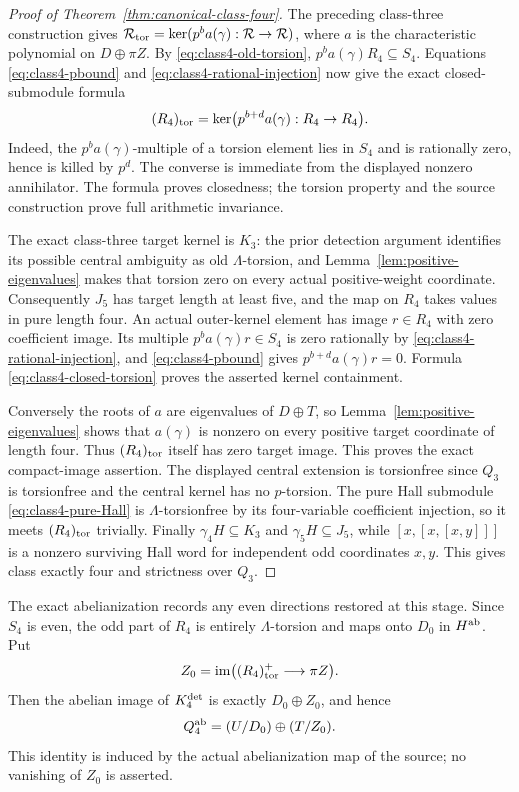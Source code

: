 \documentclass[11pt]{article}
\theoremstyle{definition}\newtheorem{definition}[theorem]{Definition}
\begin{document}
\begin{proof}[Proof of Theorem~\ref{thm:canonical-class-four}]
The preceding class-three construction gives
$\mathcal R_{\rm tor}=\ker(p^ba(\gamma):\mathcal R\to\mathcal R)$, where $a$
is the characteristic polynomial on $D\oplus\pi Z$.
By \eqref{eq:class4-old-torsion},
$p^ba(\gamma)R_4\subseteq S_4$. Equations
\eqref{eq:class4-pbound} and
\eqref{eq:class4-rational-injection} now give the exact
closed-submodule formula
\begin{equation}\label{eq:class4-closed-torsion}
 (R_4)_{\rm tor}
       =\ker\bigl(p^{b+d}a(\gamma):R_4\to R_4\bigr).
\end{equation}
Indeed, the $p^ba(\gamma)$-multiple of a torsion element
lies in $S_4$ and is rationally zero, hence is killed
by $p^d$. The converse is immediate from the displayed
nonzero annihilator. The formula proves closedness;
the torsion property and the source construction prove
full arithmetic invariance.

The exact class-three target kernel is $K_3$:
the prior detection argument identifies its possible
central ambiguity as old $\Lambda$-torsion, and
Lemma~\ref{lem:positive-eigenvalues} makes that torsion
zero on every actual positive-weight coordinate.
Consequently $J_5$ has target length at least five,
and the map on $R_4$ takes values in pure length four.
An actual outer-kernel element has image $r\in R_4$
with zero coefficient image. Its multiple
$p^ba(\gamma)r\in S_4$ is zero rationally by
\eqref{eq:class4-rational-injection}, and
\eqref{eq:class4-pbound} gives
$p^{b+d}a(\gamma)r=0$. Formula
\eqref{eq:class4-closed-torsion} proves the asserted
kernel containment.

Conversely the roots of $a$ are eigenvalues of
$D\oplus T$, so Lemma~\ref{lem:positive-eigenvalues}
shows that $a(\gamma)$ is nonzero on every positive
target coordinate of length four. Thus
$(R_4)_{\rm tor}$ itself has zero target image.
This proves the exact compact-image assertion.
The displayed central extension is torsionfree since
$Q_3$ is torsionfree and the central kernel has no
$p$-torsion. The pure Hall submodule
\eqref{eq:class4-pure-Hall} is $\Lambda$-torsionfree by
its four-variable coefficient injection, so it meets
$(R_4)_{\rm tor}$ trivially. Finally
$\gamma_4H\subseteq K_3$ and $\gamma_5H\subseteq J_5$,
while $[x,[x,[x,y]]]$ is a nonzero surviving Hall word
for independent odd coordinates $x,y$. This gives
class exactly four and strictness over $Q_3$.
\end{proof}

The exact abelianization records any even directions
restored at this stage. Since $S_4$ is even, the odd
part of $R_4$ is entirely $\Lambda$-torsion and maps
onto $D_0$ in $H^{\rm ab}$. Put
\[
 Z_0=\operatorname{im}\bigl((R_4)_{\rm tor}^+
                                     \longrightarrow\pi Z\bigr).
\]
Then the abelian image of $K_4^{\rm det}$ is exactly
$D_0\oplus Z_0$, and hence
\[
                       Q_4^{\rm ab}=(U/D_0)\oplus(T/Z_0).
\]
This identity is induced by the actual abelianization
map of the source; no vanishing of $Z_0$ is asserted.
\end{document}
